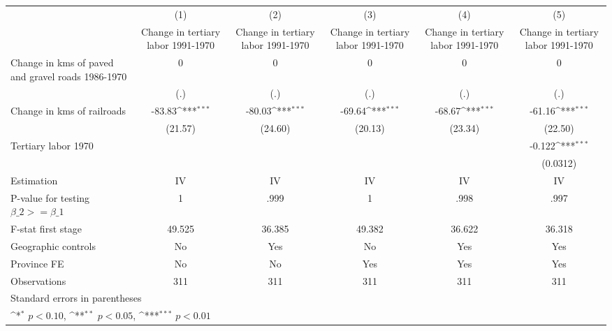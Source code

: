 {
\def\sym#1{\ifmmode^{#1}\else\(^{#1}\)\fi}
\begin{tabular}{l*{5}{c}}
\hline\hline
                    &\multicolumn{1}{c}{(1)}&\multicolumn{1}{c}{(2)}&\multicolumn{1}{c}{(3)}&\multicolumn{1}{c}{(4)}&\multicolumn{1}{c}{(5)}\\
                    &\multicolumn{1}{c}{Change in tertiary labor 1991-1970}&\multicolumn{1}{c}{Change in tertiary labor 1991-1970}&\multicolumn{1}{c}{Change in tertiary labor 1991-1970}&\multicolumn{1}{c}{Change in tertiary labor 1991-1970}&\multicolumn{1}{c}{Change in tertiary labor 1991-1970}\\
\hline
Change in kms of paved and gravel roads 1986-1970&           0         &           0         &           0         &           0         &           0         \\
                    &         (.)         &         (.)         &         (.)         &         (.)         &         (.)         \\
[1em]
Change in kms of railroads&      -83.83\sym{***}&      -80.03\sym{***}&      -69.64\sym{***}&      -68.67\sym{***}&      -61.16\sym{***}\\
                    &     (21.57)         &     (24.60)         &     (20.13)         &     (23.34)         &     (22.50)         \\
[1em]
Tertiary labor 1970 &                     &                     &                     &                     &      -0.122\sym{***}\\
                    &                     &                     &                     &                     &    (0.0312)         \\
\hline
Estimation          &          IV         &          IV         &          IV         &          IV         &          IV         \\
P-value for testing $\beta\_2 >= \beta\_1$&           1         &        .999         &           1         &        .998         &        .997         \\
F-stat first stage  &      49.525         &      36.385         &      49.382         &      36.622         &      36.318         \\
Geographic controls &          No         &         Yes         &          No         &         Yes         &         Yes         \\
Province FE         &          No         &          No         &         Yes         &         Yes         &         Yes         \\
Observations        &         311         &         311         &         311         &         311         &         311         \\
\hline\hline
\multicolumn{6}{l}{\footnotesize Standard errors in parentheses}\\
\multicolumn{6}{l}{\footnotesize \sym{*} \(p<0.10\), \sym{**} \(p<0.05\), \sym{***} \(p<0.01\)}\\
\end{tabular}
}
